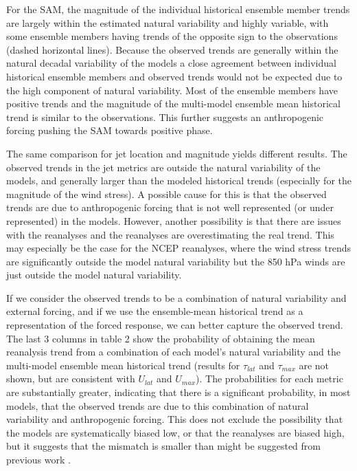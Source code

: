 For the SAM, the magnitude of the individual historical ensemble member trends
are largely within the estimated natural variability and highly variable, with
some ensemble members having trends of the opposite sign to the observations
(dashed horizontal lines). Because the observed trends are generally within the
natural decadal variability of the models a close agreement between individual
historical ensemble members and observed trends would not be expected due to the
high component of natural variability. Most of the ensemble members have
positive trends and the magnitude of the multi-model ensemble mean historical
trend is similar to the observations. This further suggests an anthropogenic
forcing pushing the SAM towards positive phase.

The same comparison for jet location and magnitude yields different results.
The observed trends in the jet metrics are outside the natural variability of
the models, and generally larger than the modeled historical trends (especially
for the magnitude of the wind stress). A possible cause for this is that the
observed trends are due to anthropogenic forcing that is not well represented
(or under represented) in the models.  However, another possibility is that
there are issues with the reanalyses and the reanalyses are overestimating the
real trend.  This may especially be the case for the NCEP reanalyses, where the
wind stress trends  are significantly outside the model natural variability but
the 850 hPa winds are just outside the model natural variability.

If we consider the observed trends to be a combination of natural variability
and external forcing, and if we use the ensemble-mean historical trend as a
representation of the forced response, we can better capture the observed trend.
The last 3 columns in table 2 show the probability of obtaining the mean
reanalysis trend from a combination of each model's natural variability and the
multi-model ensemble mean historical trend (results for $\tau_{lat}$ and
$\tau_{max}$ are not shown, but are consistent with $U_{lat}$ and $U_{max}$).
The probabilities for each metric are substantially greater, indicating that
there is a significant probability, in most models, that the observed trends are
due to this combination of natural variability and anthropogenic forcing. This
does not exclude the possibility that the models are systematically biased low,
or that the reanalyses are biased high, but it suggests that the mismatch is
smaller than might be suggested from previous work \citep{Swart2012a}.

